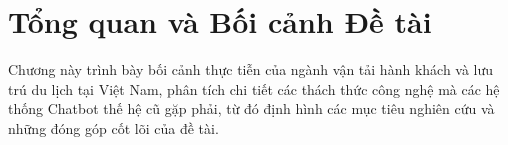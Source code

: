\chapter{Tổng quan và Bối cảnh Đề tài}
\label{chap:gioi_thieu}

Chương này trình bày bối cảnh thực tiễn của ngành vận tải hành khách và lưu trú du lịch tại Việt Nam, phân tích chi tiết các thách thức công nghệ mà các hệ thống Chatbot thế hệ cũ gặp phải, từ đó định hình các mục tiêu nghiên cứu và những đóng góp cốt lõi của đề tài.





